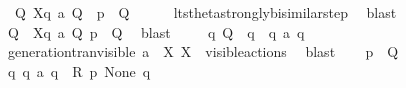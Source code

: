 \begin{isabellebody}
\ {\isacartoucheopen}{\isasymexists}\ Q{\isacharprime}{\kern0pt}{\isachardot}{\kern0pt}\ {\isasymtheta}{\isacharbrackleft}{\kern0pt}X{\isacharbrackright}{\kern0pt}{\isacharparenleft}{\kern0pt}q{\isacharparenright}{\kern0pt}\ {\isasymlongmapsto}\isactrlsup {\isasymtheta}a\ Q{\isacharprime}{\kern0pt}\ {\isasymand}\ {\isasymtheta}{\isacharparenleft}{\kern0pt}p{\isacharprime}{\kern0pt}{\isacharparenright}{\kern0pt}\ {\isasymleftrightarrow}\ Q{\isacharprime}{\kern0pt}{\isacartoucheclose}\isanewline
\ \ \ \ \isamarkupfalse%
\ lts{\isacharunderscore}{\kern0pt}theta{\isachardot}{\kern0pt}strongly{\isacharunderscore}{\kern0pt}bisimilar{\isacharunderscore}{\kern0pt}step{\isacharparenleft}{\kern0pt}{}{\isacharparenright}{\kern0pt}\ \isamarkupfalse%
\ blast\isanewline
\ \ \isamarkupfalse%
\ \isamarkupfalse%
\ Q{\isacharprime}{\kern0pt}\ \ {\isacartoucheopen}{\isasymtheta}{\isacharbrackleft}{\kern0pt}X{\isacharbrackright}{\kern0pt}{\isacharparenleft}{\kern0pt}q{\isacharparenright}{\kern0pt}\ {\isasymlongmapsto}\isactrlsup {\isasymtheta}a\ Q{\isacharprime}{\kern0pt}{\isacartoucheclose}\ {\isacartoucheopen}{\isasymtheta}{\isacharparenleft}{\kern0pt}p{\isacharprime}{\kern0pt}{\isacharparenright}{\kern0pt}\ {\isasymleftrightarrow}\ Q{\isacharprime}{\kern0pt}{\isacartoucheclose}\ \isamarkupfalse%
\ blast\isanewline
\ \ \isamarkupfalse%
\ {\isacartoucheopen}{\isasymexists}\ q{\isacharprime}{\kern0pt}{\isachardot}{\kern0pt}\ Q{\isacharprime}{\kern0pt}\ {\isacharequal}{\kern0pt}\ {\isasymtheta}{\isacharparenleft}{\kern0pt}q{\isacharprime}{\kern0pt}{\isacharparenright}{\kern0pt}\ {\isasymand}\ q\ {\isasymlongmapsto}a\ q{\isacharprime}{\kern0pt}{\isacartoucheclose}\ \isamarkupfalse%
\ generation{\isacharunderscore}{\kern0pt}tran{\isacharunderscore}{\kern0pt}visible\ {\isacartoucheopen}a\ {\isasymin}\ X{\isacartoucheclose}\ {\isacartoucheopen}X\ {\isasymsubseteq}\ visible{\isacharunderscore}{\kern0pt}actions{\isacartoucheclose}\ \isamarkupfalse%
\ blast\isanewline
\ \ \isamarkupfalse%
\ {\isacartoucheopen}{\isasymtheta}{\isacharparenleft}{\kern0pt}p{\isacharprime}{\kern0pt}{\isacharparenright}{\kern0pt}\ {\isasymleftrightarrow}\ Q{\isacharprime}{\kern0pt}{\isacartoucheclose}\ \isamarkupfalse%
\ {\isacartoucheopen}{\isasymexists}q{\isacharprime}{\kern0pt}{\isachardot}{\kern0pt}\ q\ {\isasymlongmapsto}a\ q{\isacharprime}{\kern0pt}\ {\isasymand}\ {\isacharquery}{\kern0pt}R\ p{\isacharprime}{\kern0pt}\ None\ q{\isacharprime}{\kern0pt}{\isacartoucheclose}\ \isamarkupfalse%

\end{isabellebody}
